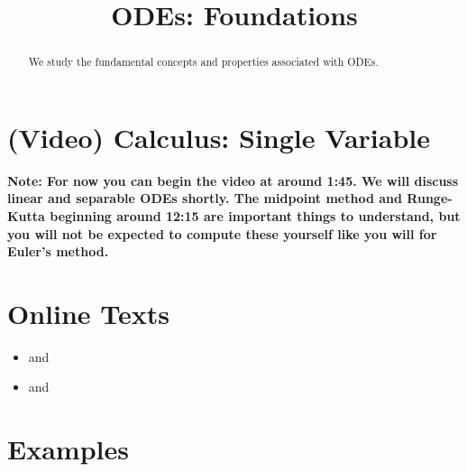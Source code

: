 \documentclass{ximera}
\title{ODEs: Foundations}
\begin{document}
\begin{abstract}
We study the fundamental concepts and properties associated with ODEs.
\end{abstract}
\maketitle

\section*{(Video) Calculus: Single Variable}
\textbf{Note: For now you can begin the video at around 1:45. We will discuss linear and separable ODEs shortly. The midpoint method and Runge-Kutta beginning around 12:15 are important things to understand, but you will not be expected to compute these yourself like you will for Euler's method.}

\section*{Online Texts}
\begin{itemize}
\item {} and 
\item {} and 
\end{itemize}

\section*{Examples}

\begin{example}

\end{example}

\begin{example}

\end{example}
\end{document}
